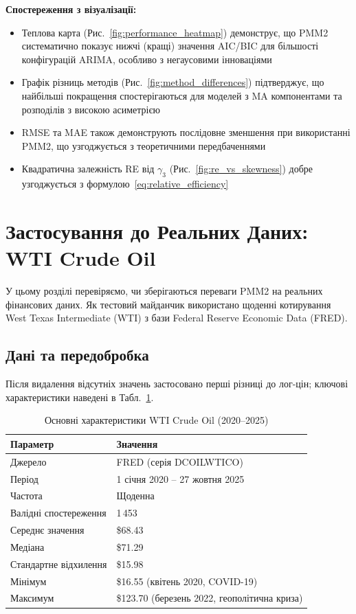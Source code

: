 \documentclass[12pt,a4paper]{article}
\begin{document}
\textbf{Спостереження з візуалізації:}
\begin{itemize}
    \item Теплова карта (Рис.~\ref{fig:performance_heatmap}) демонструє, що PMM2 систематично показує нижчі (кращі) значення AIC/BIC для більшості конфігурацій ARIMA, особливо з негаусовими інноваціями
    \item Графік різниць методів (Рис.~\ref{fig:method_differences}) підтверджує, що найбільші покращення спостерігаються для моделей з MA компонентами та розподілів з високою асиметрією
    \item RMSE та MAE також демонструють послідовне зменшення при використанні PMM2, що узгоджується з теоретичними передбаченнями
    \item Квадратична залежність RE від $\gamma_3$ (Рис.~\ref{fig:re_vs_skewness}) добре узгоджується з формулою~\eqref{eq:relative_efficiency}
\end{itemize}


\section{Застосування до Реальних Даних: WTI Crude Oil}
\label{sec:wti_application}

У цьому розділі перевіряємо, чи зберігаються переваги PMM2 на реальних фінансових даних. Як тестовий майданчик використано щоденні котирування West Texas Intermediate (WTI) з бази Federal Reserve Economic Data (FRED).

\subsection{Дані та передобробка}
\label{subsec:wti_data_description}

Після видалення відсутніх значень застосовано перші різниці до лог-цін; ключові характеристики наведені в Табл.~\ref{tab:wti_characteristics}.

\begin{table}[htbp]
\centering
\caption{Основні характеристики WTI Crude Oil (2020--2025)}
\label{tab:wti_characteristics}
\begin{tabular}{ll}
\toprule
\textbf{Параметр} & \textbf{Значення} \\
\midrule
Джерело & FRED (серія DCOILWTICO) \\
Період & 1 січня 2020 -- 27 жовтня 2025 \\
Частота & Щоденна \\
Валідні спостереження & 1\,453 \\
Середнє значення & \$68.43 \\
Медіана & \$71.29 \\
Стандартне відхилення & \$15.98 \\
Мінімум & \$16.55 (квітень 2020, COVID-19) \\
Максимум & \$123.70 (березень 2022, геополітична криза) \\
\bottomrule
\end{tabular}
\end{table}
\end{document}
